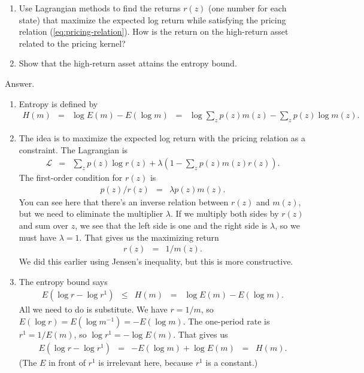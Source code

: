 \documentclass[11pt]{article}
\begin{document}
\begin{enumerate}
\begin{enumerate}
\item Use Lagrangian methods to find the returns $r(z)$ (one number for each state)
that maximize the expected log return while satisfying the pricing relation (\ref{eq:pricing-relation}).
How is the return on the high-return asset related to the pricing kernel?

\item Show that the high-return asset attains the entropy bound.
\end{enumerate}
%
Answer.
\begin{enumerate}
\item Entropy is defined by
\begin{eqnarray*}
    H(m) &=& \log E(m) - E (\log m)
            \;\;=\;\; \log \sum_z p(z) m(z) - \sum_z p(z) \log m(z) .
\end{eqnarray*}

\item The idea is to maximize the expected log return with the pricing
relation as a constraint.
The Lagrangian is
\begin{eqnarray*}
    \mathcal{L} &=&     \sum_z p(z) \log r(z)
            + \lambda \left( 1 - \sum_z p(z) m(z) r(z) \right) .
\end{eqnarray*}
The first-order condition for $r(z)$ is
\begin{eqnarray*}
     p(z) / r(z) &=&  \lambda  p(z) m(z) .
\end{eqnarray*}
You can see here that there's an inverse relation between $r(z)$ and $m(z)$,
but we need to eliminate the multiplier $\lambda$.
If we multiply both sides by $r(z)$ and sum over $z$,
we see that the left side is one and the right side is $\lambda$,
so we must have $\lambda = 1$.
That gives us the maximizing return
\begin{eqnarray*}
      r(z) &=&  1/ m(z) .
\end{eqnarray*}
We did this earlier using Jensen's inequality,
but this is more constructive.

\item The entropy bound says
\begin{eqnarray*}
    E (\log r - \log r^1) &\leq& H(m) \;\;=\;\; \log E(m) - E (\log m) .
\end{eqnarray*}
All we need to do is substitute.
We have $r = 1/m$, so
$ E (\log r) = E (\log m^{-1}) = - E (\log m)$.
The one-period rate is $ r^1 = 1/ E(m)$, so
$ \log r^1 = - \log E(m)$.
That gives us
\begin{eqnarray*}
    E (\log r - \log r^1) &=& - E (\log m) + \log E(m) \;\;=\;\; H(m) .
\end{eqnarray*}
(The $E$ in front of $r^1$ is irrelevant here, because $r^1$ is a constant.)
\end{enumerate}



\end{enumerate}
\end{document}
